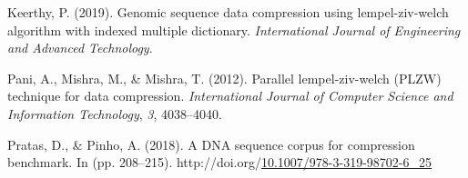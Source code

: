 \documentclass[12pt,twoside]{reedthesis}
\newlength{\cslhangindent}
\newenvironment{CSLReferences}[2] %
 {%
  \setlength{\parindent}{0pt}
  \ifodd #1 \everypar{\setlength{\hangindent}{\cslhangindent}}\ignorespaces\fi
  \ifnum #2 > 0
  \setlength{\parskip}{#2\baselineskip}
  \fi
 }%
 {}
\begin{document}
\begin{CSLReferences}{1}{0}
\leavevmode{}%
Keerthy, P. (2019). Genomic sequence data compression using lempel-ziv-welch algorithm with indexed multiple dictionary. \emph{International Journal of Engineering and Advanced Technology}.

\leavevmode{}%
Pani, A., Mishra, M., \& Mishra, T. (2012). Parallel lempel-ziv-welch (PLZW) technique for data compression. \emph{International Journal of Computer Science and Information Technology}, \emph{3}, 4038--4040.

\leavevmode{}%
Pratas, D., \& Pinho, A. (2018). A DNA sequence corpus for compression benchmark. In (pp. 208--215). http://doi.org/\href{https://doi.org/10.1007/978-3-319-98702-6_25}{10.1007/978-3-319-98702-6\_25}

\end{CSLReferences}

\end{document}
